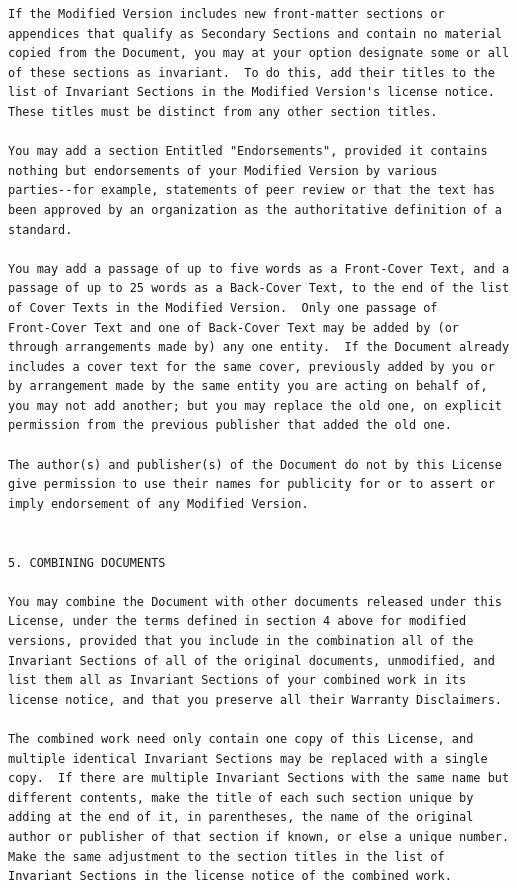 \documentclass[letterpaper,10pt,english]{sphinxmanual}
\begin{document}
\begin{Verbatim}[commandchars=\\\{\}]
If the Modified Version includes new front-matter sections or
appendices that qualify as Secondary Sections and contain no material
copied from the Document, you may at your option designate some or all
of these sections as invariant.  To do this, add their titles to the
list of Invariant Sections in the Modified Version's license notice.
These titles must be distinct from any other section titles.

You may add a section Entitled "Endorsements", provided it contains
nothing but endorsements of your Modified Version by various
parties--for example, statements of peer review or that the text has
been approved by an organization as the authoritative definition of a
standard.

You may add a passage of up to five words as a Front-Cover Text, and a
passage of up to 25 words as a Back-Cover Text, to the end of the list
of Cover Texts in the Modified Version.  Only one passage of
Front-Cover Text and one of Back-Cover Text may be added by (or
through arrangements made by) any one entity.  If the Document already
includes a cover text for the same cover, previously added by you or
by arrangement made by the same entity you are acting on behalf of,
you may not add another; but you may replace the old one, on explicit
permission from the previous publisher that added the old one.

The author(s) and publisher(s) of the Document do not by this License
give permission to use their names for publicity for or to assert or
imply endorsement of any Modified Version.


5. COMBINING DOCUMENTS

You may combine the Document with other documents released under this
License, under the terms defined in section 4 above for modified
versions, provided that you include in the combination all of the
Invariant Sections of all of the original documents, unmodified, and
list them all as Invariant Sections of your combined work in its
license notice, and that you preserve all their Warranty Disclaimers.

The combined work need only contain one copy of this License, and
multiple identical Invariant Sections may be replaced with a single
copy.  If there are multiple Invariant Sections with the same name but
different contents, make the title of each such section unique by
adding at the end of it, in parentheses, the name of the original
author or publisher of that section if known, or else a unique number.
Make the same adjustment to the section titles in the list of
Invariant Sections in the license notice of the combined work.


\end{Verbatim}
\end{document}
